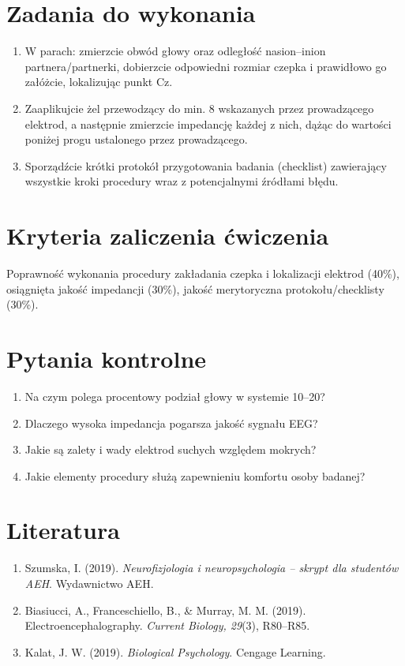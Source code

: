 \documentclass[11pt,a4paper]{article}
\begin{document}
\section{Zadania do wykonania}
\begin{enumerate}[label=\textbf{Zadanie \arabic*.}, leftmargin=2.7cm]
  \item W parach: zmierzcie obwód głowy oraz odległość nasion--inion partnera/partnerki, dobierzcie odpowiedni rozmiar czepka i prawidłowo go załóżcie, lokalizując punkt Cz.
  \item Zaaplikujcie żel przewodzący do min. 8 wskazanych przez prowadzącego elektrod, a następnie zmierzcie impedancję każdej z nich, dążąc do wartości poniżej progu ustalonego przez prowadzącego.
  \item Sporządźcie krótki protokół przygotowania badania (checklist) zawierający wszystkie kroki procedury wraz z potencjalnymi źródłami błędu.
\end{enumerate}

\section{Kryteria zaliczenia ćwiczenia}
Poprawność wykonania procedury zakładania czepka i lokalizacji elektrod (40\%), osiągnięta jakość impedancji (30\%), jakość merytoryczna protokołu/checklisty (30\%).

\section{Pytania kontrolne}
\begin{enumerate}[nosep]
  \item Na czym polega procentowy podział głowy w systemie 10--20?
  \item Dlaczego wysoka impedancja pogarsza jakość sygnału EEG?
  \item Jakie są zalety i wady elektrod suchych względem mokrych?
  \item Jakie elementy procedury służą zapewnieniu komfortu osoby badanej?
\end{enumerate}

\section{Literatura}
\begin{enumerate}[nosep]
  \item Szumska, I. (2019). \emph{Neurofizjologia i neuropsychologia -- skrypt dla studentów AEH}. Wydawnictwo AEH.
  \item Biasiucci, A., Franceschiello, B., \& Murray, M. M. (2019). Electroencephalography. \emph{Current Biology, 29}(3), R80--R85.
  \item Kalat, J. W. (2019). \emph{Biological Psychology}. Cengage Learning.
\end{enumerate}
\end{document}
